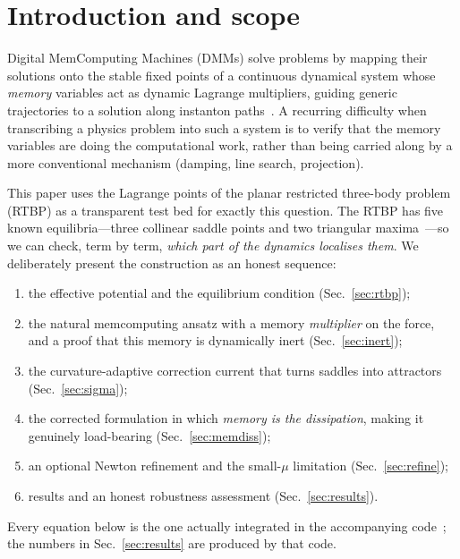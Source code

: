 \documentclass[10pt,twocolumn]{article}
\begin{document}
\section{Introduction and scope}

Digital MemComputing Machines (DMMs) solve problems by mapping their solutions
onto the stable fixed points of a continuous dynamical system whose
\emph{memory} variables act as dynamic Lagrange multipliers, guiding generic
trajectories to a solution along instanton paths~\cite{diventra2022,
traversa2015,diventra2018}. A recurring difficulty when transcribing a physics
problem into such a system is to verify that the memory variables are doing the
computational work, rather than being carried along by a more conventional
mechanism (damping, line search, projection).

This paper uses the Lagrange points of the planar restricted three-body problem
(RTBP) as a transparent test bed for exactly this question. The RTBP has five
known equilibria---three collinear saddle points and two triangular
maxima~\cite{lagrange1772,szebehely1967}---so we can check, term by term,
\emph{which part of the dynamics localises them}. We deliberately present the
construction as an honest sequence:

\begin{enumerate}
\item the effective potential and the equilibrium condition
  (Sec.~\ref{sec:rtbp});
\item the natural memcomputing ansatz with a memory \emph{multiplier} on the
  force, and a proof that this memory is dynamically inert
  (Sec.~\ref{sec:inert});
\item the curvature-adaptive correction current that turns saddles into
  attractors (Sec.~\ref{sec:sigma});
\item the corrected formulation in which \emph{memory is the dissipation},
  making it genuinely load-bearing (Sec.~\ref{sec:memdiss});
\item an optional Newton refinement and the small-$\mu$ limitation
  (Sec.~\ref{sec:refine});
\item results and an honest robustness assessment (Sec.~\ref{sec:results}).
\end{enumerate}

Every equation below is the one actually integrated in the accompanying
code~\cite{github2026}; the numbers in Sec.~\ref{sec:results} are produced by
that code.
\end{document}
